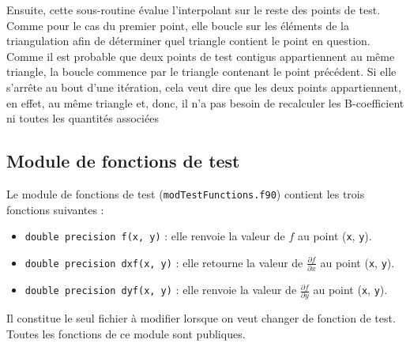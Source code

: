 \documentclass[12 pt]{article}
\begin{document}
\begin{itemize}
	Ensuite, cette sous-routine évalue l'interpolant sur le reste des points de test. Comme pour le cas du premier point, elle boucle sur les éléments de la triangulation afin de déterminer quel triangle contient le point en question. Comme il est probable que deux points de test contigus appartiennent au même triangle, la boucle commence par le triangle contenant le point précédent. Si elle s'arrête au bout d'une itération, cela veut dire que les deux points appartiennent, en effet, au même triangle et, donc, il n'a pas besoin de recalculer les B-coefficient ni toutes les quantités associées
\end{itemize}
\subsection{Module de fonctions de test}
Le module de fonctions de test (\texttt{modTestFunctions.f90}) contient les trois fonctions suivantes :
\begin{itemize}
	\item \texttt{double precision f(x, y)} : elle renvoie la valeur de $f$ au point (\texttt{x}, \texttt{y}).
	\item \texttt{double precision dxf(x, y)} : elle retourne la valeur de $\frac{\partial{f}}{\partial{x}}$ au point (\texttt{x}, \texttt{y}).
	\item \texttt{double precision dyf(x, y)} : elle renvoie la valeur de $\frac{\partial{f}}{\partial{y}}$ au point (\texttt{x}, \texttt{y}).	
\end{itemize}
Il constitue le seul fichier à modifier lorsque on veut changer de fonction de test. Toutes les fonctions de ce module sont publiques.
\end{document}
